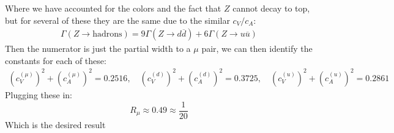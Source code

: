 \documentclass[12pt]{article}
\begin{document}
Where we have accounted for the colors and the fact that $Z$ cannot decay to top, but for several of these they are the same due to the similar $c_V/c_A$:
\begin{align*}
  \Gamma(Z\to\text{hadrons})=
  9\Gamma(Z\to d\overline{d})+6\Gamma(Z\to u\overline{u})
\end{align*}
Then the numerator is just the partial width to a $\mu$ pair, we can then identify the constants for each of these:
\begin{align*}
  {(c_V^{(\mu)})}^2+{(c_A^{(\mu)})}^2=0.2516,\quad
  {(c_V^{(d)})}^2+{(c_A^{(d)})}^2=0.3725,\quad
  {(c_V^{(u)})}^2+{(c_A^{(u)})}^2=0.2861
\end{align*}
Plugging these in:
\begin{equation}
  \label{eq:p2}
  \boxed{R_\mu\approx0.49\approx\frac1{20}}
\end{equation}
Which is the desired result
\newpage
\end{document}
